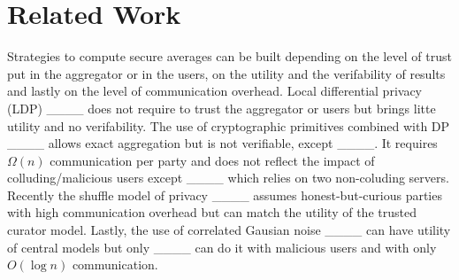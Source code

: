 \section{Related Work}
\label{sec:related}

Strategies to compute secure averages can be built depending on the level of trust put in the aggregator or in the users, on the utility and the verifability of results and lastly on the level of communication overhead.
Local differential privacy (LDP) ____ does not require to trust the aggregator or users but brings litte utility and no verifability. The use of cryptographic primitives combined with DP ____ allows exact aggregation but is not verifiable, except ____. It requires $\Omega(n)$ communication per party and does not reflect the impact of colluding/malicious users except ____ which relies on two non-coluding servers. Recently the shuffle model of privacy ____ assumes honest-but-curious parties with high communication overhead but can match the utility of the trusted curator model. Lastly, the use of correlated Gausian noise ____ can have utility of central models but only ____ can do it with malicious users and with only $O(\log n)$ communication.
